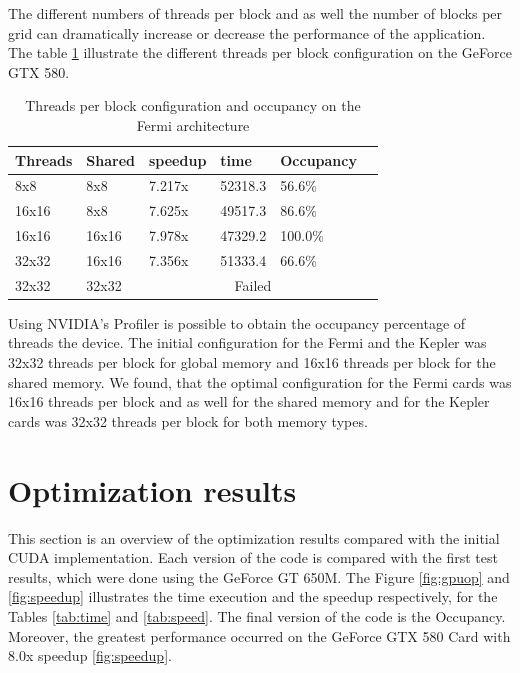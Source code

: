 The different numbers of threads per block and as well the number of blocks per grid can dramatically increase or decrease the performance of the application. The table \ref{tab:ocu} illustrate the different threads per block configuration on the GeForce GTX 580. 


\begin{table}[h]
\centering
  \begin{tabular} { | l | l | l | l | l | l | }
    \hline
    Threads & Shared & speedup & time & Occupancy \\
    \hline
     8x8 &  8x8 & 7.217x & 52318.3  & 56.6\% \\
    \hline
     16x16 & 8x8 & 7.625x & 49517.3 & 86.6\% \\
    \hline
    16x16 & 16x16 & 7.978x & 47329.2 & 100.0\% \\
    \hline
    32x32 & 16x16 & 7.356x & 51333.4 & 66.6\% \\
    \hline
    32x32 & 32x32 & \multicolumn{3}{|c|}{Failed}\\
    \hline
  \end{tabular}
  \caption{Threads per block configuration and occupancy on the Fermi architecture}
  \label{tab:ocu}
  \end{table}


Using NVIDIA's Profiler is possible to obtain the occupancy percentage of threads the device. The initial configuration for the Fermi and the Kepler was 32x32 threads per block for global memory and 16x16 threads per block for the shared memory. We found, that the optimal configuration for the Fermi cards was 16x16 threads per block and as well for the shared memory and for the Kepler cards was 32x32 threads per block for both memory types. 

\section{Optimization results}

This section is an overview of the optimization results compared with the initial CUDA implementation. Each version of the code is compared with the first test results, which were done using the GeForce GT 650M. The Figure \ref{fig:gpuop} and \ref{fig:speedup} illustrates the time execution and the speedup respectively, for the Tables \ref{tab:time} and \ref{tab:speed}. The final version of the code is the Occupancy. Moreover, the greatest performance occurred on the GeForce GTX 580 Card with 8.0x speedup \ref{fig:speedup}.

